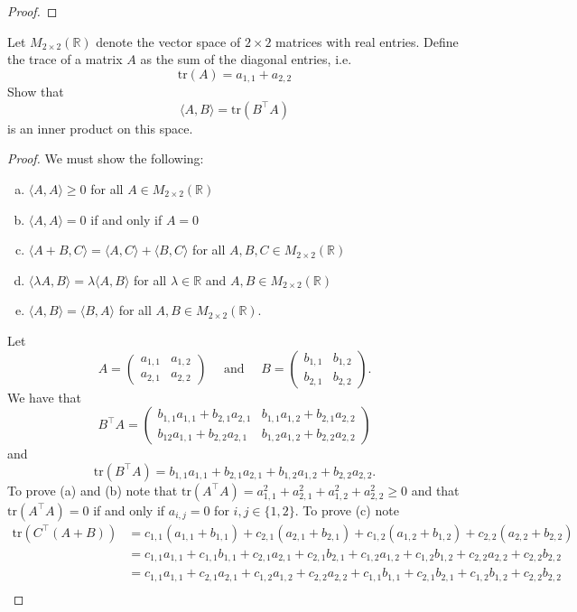 \documentclass[11pt]{exam}
\theoremstyle{definition}
\newcommand{\tr}{\text{tr}}
\begin{document}
\begin{questions}
\begin{proof}
\end{proof}
\question Let $M_{2\times 2}(\mathbb{R})$ denote the vector space of $2\times 2$ matrices with real entries.  Define the trace of a matrix $A$  as the sum of the diagonal entries, i.e. 
\[\tr(A)=a_{1,1}+a_{2,2}\]
Show that 
\[\langle A, B\rangle=\tr(B^\top A)\]
is an inner product on this space. 
\begin{proof}
We must show the following:
\begin{enumerate}[(a) ]
\item $\langle A,A\rangle\geq 0$ for all $A\in M_{2\times 2}(\mathbb{R})$
\item $\langle A,A\rangle=0$ if and only if $A=0$
\item $\langle A+B, C\rangle =\langle A, C\rangle +\langle B, C\rangle$ for all $A, B, C\in M_{2\times 2}(\mathbb{R})$
\item $\langle \lambda A, B\rangle =\lambda \langle A, B\rangle$  for all $\lambda \in \mathbb{R}$ and $A,B \in M_{2\times 2}(\mathbb{R})$
\item $\langle A,B\rangle=\langle B,A\rangle$ for all $A,B\in M_{2\times 2}(\mathbb{R})$. 
\end{enumerate}
Let 
\[A=\begin{pmatrix}a_{1,1} & a_{1,2}\\a_{2,1}& a_{2,2}\end{pmatrix} \quad \text{ and }\quad B=\begin{pmatrix}b_{1,1} & b_{1,2}\\b_{2,1}& b_{2,2}\end{pmatrix}.\]
We have that 
\[B^\top A=\begin{pmatrix}b_{1,1}a_{1,1} +b_{2,1}a_{2,1}& b_{1,1}a_{1,2}+b_{2,1}a_{2,2}\\b_{12}a_{1,1}+b_{2,2}a_{2,1}& b_{1,2}a_{1,2}+b_{2,2}a_{2,2}\end{pmatrix}\]
and 
\[\tr(B^\top A)=b_{1,1}a_{1,1}+b_{2,1}a_{2,1}+b_{1,2}a_{1,2}+b_{2,2}a_{2,2}.\]
To prove (a) and (b) note that $\tr(A^\top A)=a_{1,1}^2+a_{2,1}^2+a_{1,2}^2+a_{2,2}^2\geq 0$ and that $\tr(A^\top A)=0$ if and only if $a_{i,j}=0$ for $i,j\in\{1,2\}$.
To prove (c) note
\begin{align*}
\tr (C^\top (A+B))&=c_{1,1}(a_{1,1}+b_{1,1})+c_{2,1}(a_{2,1}+b_{2,1})+c_{1,2}(a_{1,2}+b_{1,2})+c_{2,2}(a_{2,2}+b_{2,2})\\
& =c_{1,1}a_{1,1}+c_{1,1}b_{1,1}+c_{2,1}a_{2,1}+c_{2,1}b_{2,1}+c_{1,2}a_{1,2}+c_{1,2}b_{1,2}+c_{2,2}a_{2,2}+c_{2,2}b_{2,2}\\
&=c_{1,1}a_{1,1}+c_{2,1}a_{2,1}+c_{1,2}a_{1,2}+c_{2,2}a_{2,2}+c_{1,1}b_{1,1}+c_{2,1}b_{2,1}+c_{1,2}b_{1,2}+c_{2,2}b_{2,2}\\

\end{align*}
\end{proof}
\end{questions}
\end{document}

